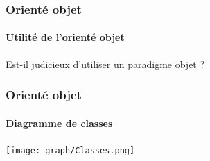 \documentclass{beamer}
\begin{document}
    \begin{frame}
        \frametitle{Orient\'e objet}
        \framesubtitle{Utilit\'e de l'orient\'e objet}
        Est-il judicieux d'utiliser un paradigme objet ?
    \end{frame}
    \begin{frame}
        \frametitle{Orient\'e objet}
        \framesubtitle{Diagramme de classes}
        \texttt{[image: graph/Classes.png]}
    \end{frame}

\end{document}

